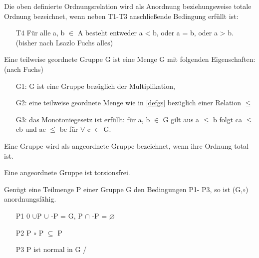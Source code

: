 Die oben definierte Ordnungsrelation wird als Anordnung beziehungsweise totale Ordnung bezeichnet, wenn neben T1-T3 anschließende Bedingung erfüllt ist:
%
\begin{enumerate}
\item[T4] Für alle a, b $ \in $ A besteht entweder a < b, oder a = b, oder a > b. (bisher nach Lsazlo Fuchs alles)
\end{enumerate}
%
%
\vspace{0.2cm}
\noindent
%
%
\begin{defn}\label{twgG}
Eine teilweise geordnete Gruppe G ist eine Menge G mit folgenden Eigenschaften: (nach Fuchs)
%
\begin{enumerate}
\item[G1:] G ist eine Gruppe bezüglich der Multiplikation,
\item[G2:] eine teilweise geordnete Menge wie in \ref{defgs} bezüglich einer Relation $ \leqslant $ 
\item[G3:] das Monotoniegesetz ist erfüllt: für a, b $\in $ G gilt aus a $ \leqslant $ b folgt ca $ \leqslant $ cb und ac $\leqslant $ bc für $\forall$ c $\in$ G.
\end{enumerate}
% 
\end{defn}
%
%
\begin{defn}\label{agG}
Eine Gruppe wird als angeordnete Gruppe bezeichnet, wenn ihre Ordnung total ist.
\end{defn}
%
\begin{satz} \label{satzaGtf} 
Eine angeordnete Gruppe ist torsionsfrei.
\end{satz}
%
%
%
\begin{satz}\label{afG}
%
Genügt eine Teilmenge P einer Gruppe G den Bedingungen P1- P3, so ist (G,$\circ $) anordnungsfähig.
%
\begin{enumerate}
\item[P1] {0} $\cup $P $\cup$ -P = G, P $\cap$ -P = $\varnothing$ 
\item[P2] P $\circ$ P $\subseteq$ P
\item[P3] P ist normal in G / %
\end{enumerate}
\end{satz}
%
%
